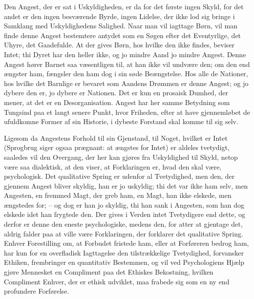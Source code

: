 \documentclass[12pt,a4paper]{article}
\begin{document}
Den Angest, der er sat i Uskyldigheden, er da for det første ingen Skyld, for det andet er den ingen besværende Byrde, ingen Lidelse, der ikke lod sig bringe i Samklang med Uskyldighedens Salighed. Naar man vil iagttage Børn, vil man finde denne Angest bestemtere antydet som en Søgen efter det Eventyrlige, det Uhyre, det Gaadefulde. At der gives Børn, hos hvilke den ikke findes, beviser Intet; thi Dyret har den heller ikke, og jo mindre Aand jo mindre Angest. Denne Angest hører Barnet saa væsentligen til, at han ikke vil undvære den; om den end ængster ham, fængsler den ham dog i sin søde Beængstelse. Hos alle de Nationer, hos hvilke det Barnlige er bevaret som Aandens Drømmen er denne Angest; og jo dybere den er, jo dybere er Nationen. Det er kun en prosaisk Dumhed, der mener, at det er en Desorganisation. Angest har her samme Betydning som Tungsind paa et langt senere Punkt, hvor Friheden, efter at have gjennemløbet de ufuldkomne Former af sin Historie, i dybeste Forstand skal komme til sig selv.

Ligesom da Angestens Forhold til sin Gjenstand, til Noget, hvilket er Intet (Sprogbrug siger ogsaa prægnant: at ængstes for Intet) er aldeles tvetydigt, saaledes vil den Overgang, der her kan gjøres fra Uskyldighed til Skyld, netop være saa dialektisk, at den viser, at Forklaringen er, hvad den skal være, psychologisk. Det qualitative Spring er udenfor al Tvetydighed, men den, der gjennem Angest bliver skyldig, han er jo uskyldig; thi det var ikke ham selv, men Angesten, en fremmed Magt, der greb ham, en Magt, han ikke elskede, men ængstedes for; – og dog er han jo skyldig, thi han sank i Angesten, som han dog elskede idet han frygtede den. Der gives i Verden intet Tvetydigere end dette, og derfor er denne den eneste psychologiske, medens den, for atter at gjentage det, aldrig falder paa at ville være Forklaringen, der forklarer det qualitative Spring. Enhver Forestilling om, at Forbudet fristede ham, eller at Forføreren bedrog ham, har kun for en overfladisk Iagttagelse den tilstrækkelige Tvetydighed, forvansker Ethiken, frembringer en quantitativ Bestemmen, og vil ved Psychologiens Hjælp gjøre Mennesket en Compliment paa det Ethiskes Bekostning, hvilken Compliment Enhver, der er ethisk udviklet, maa frabede sig som en ny end profundere Forførelse.
\end{document}
